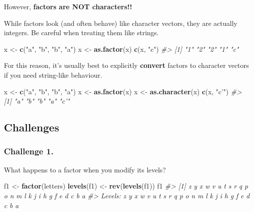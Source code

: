 \documentclass[]{book}
\newenvironment{Shaded}{\begin{snugshade}}{\end{snugshade}}
\newcommand{\KeywordTok}[1]{\textcolor[rgb]{0.13,0.29,0.53}{\textbf{#1}}}
\newcommand{\StringTok}[1]{\textcolor[rgb]{0.31,0.60,0.02}{#1}}
\newcommand{\CommentTok}[1]{\textcolor[rgb]{0.56,0.35,0.01}{\textit{#1}}}
\newcommand{\NormalTok}[1]{#1}
\begin{document}
However, \textbf{factors are NOT characters!!}

While factors look (and often behave) like character vectors, they are
actually integers. Be careful when treating them like strings.

\begin{Shaded}
\begin{Highlighting}[]
\NormalTok{x <-}\StringTok{ }\KeywordTok{c}\NormalTok{(}\StringTok{"a"}\NormalTok{, }\StringTok{"b"}\NormalTok{, }\StringTok{"b"}\NormalTok{, }\StringTok{"a"}\NormalTok{)}
\NormalTok{x <-}\StringTok{ }\KeywordTok{as.factor}\NormalTok{(x)}
\KeywordTok{c}\NormalTok{(x, }\StringTok{"c"}\NormalTok{)}
\CommentTok{#> [1] "1" "2" "2" "1" "c"}
\end{Highlighting}
\end{Shaded}

For this reason, it's usually best to explicitly \textbf{convert}
factors to character vectors if you need string-like behaviour.

\begin{Shaded}
\begin{Highlighting}[]
\NormalTok{x <-}\StringTok{ }\KeywordTok{c}\NormalTok{(}\StringTok{"a"}\NormalTok{, }\StringTok{"b"}\NormalTok{, }\StringTok{"b"}\NormalTok{, }\StringTok{"a"}\NormalTok{)}
\NormalTok{x <-}\StringTok{ }\KeywordTok{as.factor}\NormalTok{(x)}
\NormalTok{x <-}\StringTok{ }\KeywordTok{as.character}\NormalTok{(x)}
\KeywordTok{c}\NormalTok{(x, }\StringTok{"c'"}\NormalTok{)}
\CommentTok{#> [1] "a"  "b"  "b"  "a"  "c'"}
\end{Highlighting}
\end{Shaded}

\subsection{Challenges}\label{challenges-7}

\subsubsection*{Challenge 1.}\label{challenge-1.-2}

What happens to a factor when you modify its levels?

\begin{Shaded}
\begin{Highlighting}[]
\NormalTok{f1 <-}\StringTok{ }\KeywordTok{factor}\NormalTok{(letters)}
\KeywordTok{levels}\NormalTok{(f1) <-}\StringTok{ }\KeywordTok{rev}\NormalTok{(}\KeywordTok{levels}\NormalTok{(f1))}
\NormalTok{f1}
\CommentTok{#>  [1] z y x w v u t s r q p o n m l k j i h g f e d c b a}
\CommentTok{#> Levels: z y x w v u t s r q p o n m l k j i h g f e d c b a}
\end{Highlighting}
\end{Shaded}
\end{document}
